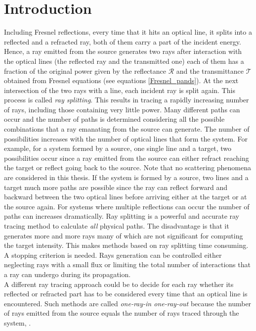 \section{Introduction}
Including Fresnel reflections, every time that it hits an optical line, it splits into a reflected and a refracted ray, both of them carry a part of the incident energy.
Hence, a ray emitted from the source generates two rays after interaction with the optical lines (the reflected ray and the transmitted one) each of them has a fraction of the original power given by the reflectance $\mathcal{R}$ and the transmittance $\mathcal{T}$ obtained from Fresnel equations (see equations \ref{Fresnel_pands}).
At the next intersection of the two rays with a line, each incident ray is split
again. This process is called \textit{ray splitting}. 
This results in tracing a rapidly increasing number of rays, including those containing very little power. 
Many different paths can occur and the number of paths is determined considering all the possible combinations that a ray emanating from the source can generate. The number of possibilities increases with the number of optical lines that form the system. For example, for a system formed by a source, one single line and a target, two possibilities occur since a ray emitted from the source can either refract reaching the target or reflect going back to the source. Note that no scattering phenomena are considered in this thesis. If the system is formed by a source, two lines and a target much more paths are possible since the ray can reflect forward and backward between the two optical lines before arriving either at the target or at the source again. For systems where multiple reflections can occur the number of paths can increases dramatically. Ray splitting is a powerful and accurate ray tracing method to calculate \textit{all} physical paths. The disadvantage is that it generates more and more rays many of which are not significant for computing the target intensity. This makes methods based on ray splitting time consuming. A stopping criterion is needed. Rays generation can be controlled either neglecting rays with a small flux or limiting the total number of interactions that a ray can undergo during its propagation. \\ \indent A different ray tracing approach could be to decide for each ray whether its reflected or refracted part has to be considered every time that an optical line is encountered. Such methods are called \textit{one-ray-in one-ray-out} because the number of rays emitted from the source equals the number of rays traced through the system, \cite{koshel2012illumination}.\\ \indent
